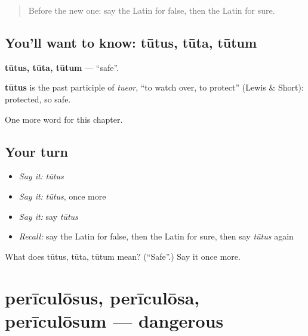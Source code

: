 \label{lesson:LA-C147-tutus}



\begin{quote}
Before the new one: say the Latin for false, then the Latin for sure.
\end{quote}

\subsection*{You'll want to know: tūtus, tūta, tūtum}
\textbf{tūtus, tūta, tūtum} — \textquotedblleft{}safe\textquotedblright{}.

\begin{cousinweb}
\textbf{tūtus} is the past participle of \emph{tueor}, \textquotedblleft{}to watch over, to protect\textquotedblright{} (Lewis \& Short): protected, so safe.
\end{cousinweb}

\begin{grammarlens}[title={What you've built}]
One more word for this chapter.
\end{grammarlens}

\subsection*{Your turn}
\begin{itemize}
\raggedright
  \item \emph{Say it:} \emph{tūtus}
  \item \emph{Say it:} \emph{tūtus}, once more
  \item \emph{Say it:} say \emph{tūtus}
  \item \emph{Recall:} say the Latin for false, then the Latin for sure, then say \emph{tūtus} again
\end{itemize}

\begin{tcolorbox}[breakable,colback=teal!4,colframe=teal!35!black,title={Before you move on}]
What does tūtus, tūta, tūtum mean? (\textquotedblleft{}Safe\textquotedblright{}.) Say it once more.
\end{tcolorbox}
\section[perīculōsus, perīculōsa, perīculōsum]{perīculōsus, perīculōsa, perīculōsum — dangerous}

\label{lesson:LA-C147-periculosus}



